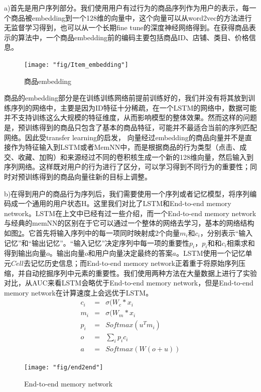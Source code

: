 a)首先是用户序列部分。我们使用用户有过行为的商品序列作为用户的表示，每一个商品被embedding到一个128维的向量中，这个向量可以从word2vec的方法进行无监督学习得到，也可以从一个长期fine tune的深度神经网络得到。在获得商品表示的算法中，一个商品embedding前的编码主要包括商品ID、店铺、类目、价格信息。

\begin{figure}[h]
	\centering
	\texttt{[image: "fig/Item\_embedding"]}
	\caption{商品embedding}
	\label{fig:Item_embedding}
\end{figure}

商品的embedding部分是在训练训练网络前提前训练好的，我们并没有将其放到训练序列的网络中，主要是因为ID特征十分稀疏，在一个LSTM的网络中，数据可能并不支持训练这么大规模的特征维度，从而影响模型的整体效果。然而这样的问题是，预训练得到的商品只包含了基本的商品特征，可能并不最适合当前的序列匹配网络。因此受transfer learning的启发，
向量经过embedding的商品向量并不是直接作为特征输入到LSTM或者MemNN中，而是根据商品的行为类型（点击、成交、收藏、加购）和来源经过不同的卷积核生成一个新的128维向量，然后输入到序列网络。这样既对用户的行为进行了区分，可以学习得到不同行为的重要性；同时对预训练得到的商品向量往新的目标上调整。

b)在得到用户的商品行为序列后，我们需要使用一个序列或者记忆模型，将序列编码成一个通用的用户状态H。这里我们对比了LSTM和End-to-end memory network\cite{9}。LSTM在上文中已经有过一些介绍，而一个End-to-end memory network与经典的memNN的区别在于它可以通过一个整体的网络去学习，基本的网络结构如图\ref{fig:end2end}。它首先将输入序列中的每一项同时映射成2个向量$m_i$和$c_i$，分别表示“输入记忆”和“输出记忆”。“输入记忆”决定序列中每一项的重要性$p_i$，$p_i$和和$c_i$相乘求和得到输出向量$o$。输出向量$o$和用户向量决定最终的答案$a$。LSTM使用一个记忆单元$Cell$去记忆历史信息；而End-to-end memory network正着重于将原始序列压缩，并自动挖掘序列中元素的重要性。我们使用两种方法在大量数据上进行了实验对比，从AUC来看LSTM会略优于End-to-end memory network，但是End-to-end memory network在计算速度上会远优于LSTM。
\begin{eqnarray}
c_i &=& \sigma(W_{c} * x_{i}
\\
m_i &=& \sigma(W_{m} * x_{i}
\\
p_i &=& Softmax(u^T m_i)
\\
o &=& \sum_{i}p_i c_i
\\
a &=& Softmax(W(o+u))
\end{eqnarray}

\begin{figure}[h]
	\centering
	\texttt{[image: "fig/end2end"]}
	\caption{End-to-end memory network}
	\label{fig:end2end}
\end{figure}

